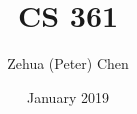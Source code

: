 \documentclass[letterpaper, 11pt]{report}
\title{CS 361}
\author{Zehua (Peter) Chen}
\date{January 2019}
\begin{document}
  \maketitle
  \tableofcontents

  
  
  
  
  
  
  
  
  
  
  
  

  \newpage
  \printglossary
\end{document}
